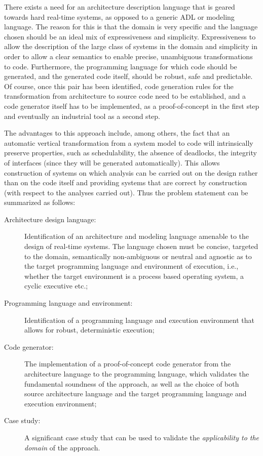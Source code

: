 There exists a need for an architecture description language that is
geared towards hard real-time systems, as opposed to a generic ADL or
modeling language. The reason for this is that the domain is very
specific and the language chosen should be an ideal mix of
expressiveness and simplicity. Expressiveness to allow the description
of the large class of systems in the domain and simplicity in order to
allow a clear semantics to enable precise, unambiguous transformations
to code. Furthermore, the programming language for which code should
be generated, and the generated code itself, should be robust, safe
and predictable. Of course, once this pair has been identified, code
generation rules for the transformation from architecture to source
code need to be established, and a code generator itself has to be
implemented, as a proof-of-concept in the first step and eventually an
industrial tool as a second step.

The advantages to this approach include, among others, the fact that
an automatic vertical transformation from a system model to code will
intrinsically preserve properties, such as schedulability, the absence
of deadlocks, the integrity of interfaces (since they will be
generated automatically). This allows construction of systems on which
analysis can be carried out on the design rather than on the code
itself and providing systems that are correct by construction (with
respect to the analyses carried out). Thus the problem statement can
be summarized as follows:

\begin{description}
\item[Architecture design language:]{Identification of an architecture
  and modeling language amenable to the design of real-time
  systems. The language chosen must be concise, targeted to the
  domain, semantically non-ambiguous or neutral and agnostic as to the
  target programming language and environment of execution, i.e.,
  whether the target environment is a process based operating system,
  a cyclic executive etc.;}
\item[Programming language and environment:]{Identification of a
  programming language and execution environment that allows for
  robust, deterministic execution;}
\item[Code generator:]{The implementation of a proof-of-concept code
  generator from the architecture language to the programming
  language, which validates the fundamental soundness of the approach,
  as well as the choice of both source architecture language and the
  target programming language and execution environment;}
\item[Case study:]{A significant case study that can be used to
  validate the \emph{applicability to the domain} of the approach.}
\end{description}

